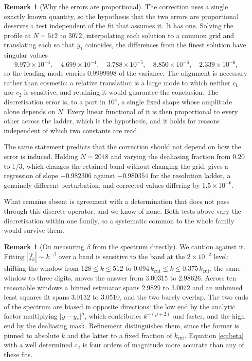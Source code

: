 \documentclass[11pt]{article}
\theoremstyle{definition}
\newtheorem{remark}[proposition]{Remark}
\newcommand{\abs}[1]{\left\lvert #1 \right\rvert}
\begin{document}
\begin{remark}[Why the errors are proportional]
\label{rem:oneanchor}
The correction uses a single exactly known quantity, so the hypothesis that the
two errors are proportional deserves a test independent of the fit that assumes
it. It has one. Solving the profile at $N=512$ to $3072$, interpolating each
solution to a common grid and translating each so that $y_1$ coincides, the
differences from the finest solution have singular values
\begin{equation}
  9.970\times10^{-1},\quad 4.699\times10^{-4},\quad 3.788\times10^{-5},\quad
  8.850\times10^{-6},\quad 2.339\times10^{-6},
\end{equation}
so the leading mode carries $0.9999998$ of the variance. The alignment is
necessary rather than cosmetic: a relative translation is a large mode to which
neither $c_1$ nor $c_2$ is sensitive, and retaining it would guarantee the
conclusion. The discretisation error is, to a part in $10^{4}$, a single fixed
shape whose amplitude alone depends on $N$. Every linear functional of it is
then proportional to every other across the ladder, which is the hypothesis,
and it holds for reasons independent of which two constants are read.

The same statement predicts that the correction should not depend on how the
error is induced. Holding $N=2048$ and varying the dealiasing fraction from
$0.20$ to $1/3$, which changes the retained band without changing the grid,
gives a regression of slope $-0.982306$ against $-0.980354$ for the resolution
ladder, a genuinely different perturbation, and corrected values differing by
$1.5\times10^{-6}$.

What remains absent is agreement with a determination that does not pass
through this discrete operator, and we know of none. Both tests above vary the
discretisation within one family, so a systematic common to the whole family
would survive them.
\end{remark}

\begin{remark}[On measuring $\beta$ from the spectrum directly]
We caution against it. Fitting $\abs{\hat f_k}\sim k^{-\beta}$ over a band is
sensitive to the band at the $2\times10^{-2}$ level: shifting the window from
$128 \le k \le 512$ to $0.094\,k_{\mathrm{cut}} \le k \le
0.375\,k_{\mathrm{cut}}$, the same window to three digits, moves the answer
from $3.00315$ to $2.98626$. Across ten reasonable windows a binned estimator
spans $2.9829$ to $3.0072$ and an unbinned least squares fit spans $3.0132$ to
$3.0510$, and the two barely overlap. The two ends of the spectrum are biased
in opposite directions: the low end by the analytic factor multiplying
$\abs{y-y_\ast}^\mu$, which contributes $k^{-(\mu+2)}$ and faster, and the high
end by the dealiasing mask. Refinement distinguishes them, since the former is
pinned to absolute $k$ and the latter to a fixed fraction of
$k_{\mathrm{cut}}$. Equation \eqref{eq:beta} with a well determined $c_2$ is
four orders of magnitude more accurate than any of these fits.
\end{remark}
\end{document}
